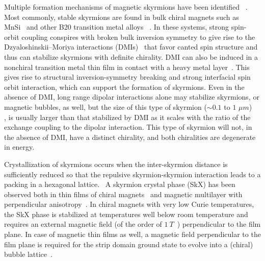 \documentclass[10pt,onecolumn,prb,aps,notitlepage]{revtex4}
\begin{document}
Multiple formation mechanisms of magnetic skyrmions have been identified~%
\cite%
{Lin73APL_bubble-garnet,Takao83JMMM_bubble-FM-film,slon79book-bubble,Muhlbauer09Sci_skyrmion,Okubo12PRL_sk-fluc-ex,Heinze11NatPhys_sk-4spin,Jiang15Sci-bubble-sk,heinonen16PRB_sk-SH}%
. Most commonly, stable skyrmions are found in bulk chiral magnets such as
MnSi~\cite%
{Muhlbauer09Sci_skyrmion,Lebech95JMMM_SkX-A-phase,Pfleiderer12PRB_MnSi-SkX}
and other B20 transition metal alloys~\cite%
{Grigoriev09PRL_DM-FeCoSi,Uchida08PRB_Skrm-FeGe,Yu&Tokura11NatMater_skrm-FeGe,Wilhelm11PRL_Helimag-FeGe,ShibataK.13NatNano_skrm-helimag}%
. In these systems, strong spin-orbit coupling conspires with broken bulk
inversion symmetry to give rise to the Dzyaloshinskii--Moriya interactions
(DMIs)~\cite{DZYALOSHINSKY58JPCS_DMintxn,Moriya60PR_DM-intxn} that favor
canted spin structure and thus can stabilize skyrmions with definite
chirality.
DMI can also be induced in a nonchiral transition metal thin film
in contact with a heavy metal layer~\cite%
{Emori13Nat.Mater_thin-film-interfacial-DMI,Ryu&Parkin13NatNano_thinFilmDMI}. This
gives rise to structural inversion-symmetry breaking and strong interfacial spin
orbit interaction, which can support the formation of skyrmions.
Even in the
absence of DMI, long range dipolar interactions alone may stabilize skyrmions, or magnetic bubbles,
as well, but the size of this type of skyrmion ($\sim 0.1$ to $1$ $\mu m$) ~%
\cite{slon79book-bubble,Nagaosa13Nat.Nano_Skyrmion}, is usually larger than
that stabilized by DMI as it scales with the ratio
of the exchange coupling to the dipolar interaction. This type of skyrmion will not, in the absence of DMI, have a distinct chirality, and both chiralities are degenerate in energy.

Crystallization of skyrmions occurs when the inter-skyrmion distance is
sufficiently reduced so that the repulsive skyrmion-skyrmion interaction leads to a packing in a hexagonal lattice.~\cite%
{McMillan75_sk-CDW,Hubert94_sk-Interaction,Leonov16NJP_sk-intxn}
A skyrmion crystal phase (SkX) has been observed both in thin films of chiral
magnets~\cite{Lebech95JMMM_SkX-A-phase,Bauer12PRB_MnSi-SkX} and magnetic
multilayer with perpendicular anisotropy~\cite{Fullerton17PRB_dipole-sk}. In
chiral magnets with very low Curie temperatures, the SkX phase is stabilized at
temperatures well below room temperature and requires an external magnetic field
(of the order of $1~T$~\cite{Nagaosa13Nat.Nano_Skyrmion,Fert17NatComm-Sk-review}) perpendicular to the film plane. In case of magnetic thin films as well, a magnetic field perpendicular to the film plane is required for the strip domain ground state to evolve into a (chiral) bubble lattice~\cite{Jiang15Sci-bubble-sk,Woo16NatMater_sk-thinFilm,Fert16Nat.Nano_add-DMI,Boulle16NatNano_sk-thinFilm,cd16SciRep_skyrm_CoPt}.
\end{document}
